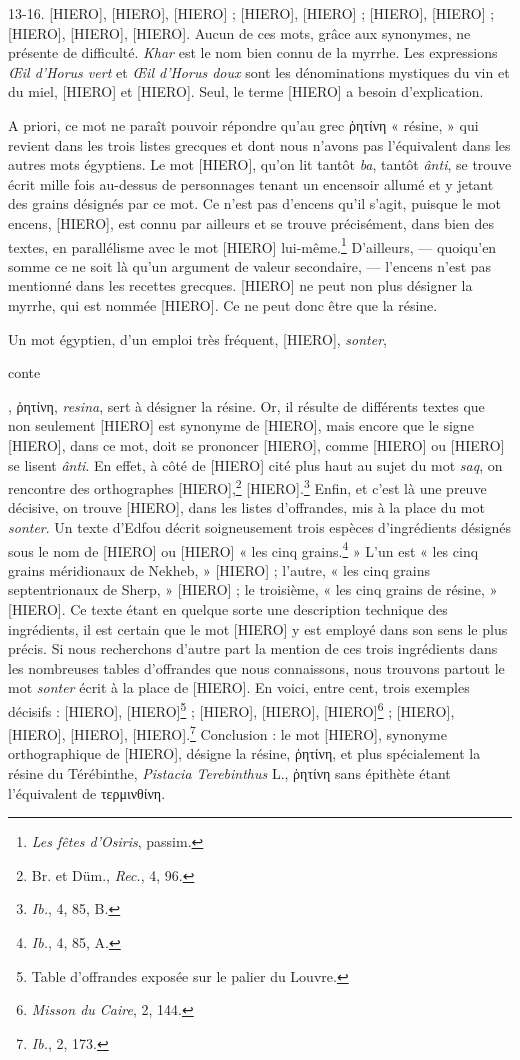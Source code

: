 \documentclass[a4paper, 11pt, oneside]{article}
\begin{document}
13-16. [HIERO], [HIERO], [HIERO] ; [HIERO], [HIERO] ; [HIERO], [HIERO] ; [HIERO], [HIERO], [HIERO]. Aucun de ces mots, grâce aux synonymes, ne présente de difficulté. \emph{Khar} est le nom bien connu de la myrrhe. Les expressions \emph{Œil d'Horus vert} et \emph{Œil d'Horus doux} sont les dénominations mystiques du vin et du miel, [HIERO] et [HIERO]. Seul, le terme [HIERO] a besoin d'explication.

A priori, ce mot ne paraît pouvoir répondre qu'au grec ῥητίνη « résine, » qui revient dans les trois listes grecques et dont nous n'avons pas l'équivalent dans les autres mots égyptiens. Le mot [HIERO], qu'on lit tantôt \emph{ba}, tantôt \emph{ânti}, se trouve écrit mille fois au-dessus de personnages tenant un encensoir allumé et y jetant des grains désignés par ce mot. Ce n'est pas d'encens qu'il s'agit, puisque le mot encens, [HIERO], est connu par ailleurs et se trouve précisément, dans bien des textes, en parallélisme avec le mot [HIERO] lui-même.\footnote{\emph{Les fêtes d'Osiris}, passim.} D'ailleurs, --- quoiqu'en somme ce ne soit là qu'un argument de valeur secondaire, --- l'encens n'est pas mentionné dans les recettes grecques. [HIERO] ne peut non plus désigner la myrrhe, qui est nommée [HIERO]. Ce ne peut donc être que la résine.

Un mot égyptien, d'un emploi très fréquent, [HIERO], \emph{sonter}, \begin{coptic}conte\end{coptic}, ῥητίνη, \emph{resina}, sert à désigner la résine. Or, il résulte de différents textes que non seulement [HIERO] est synonyme de [HIERO], mais encore que le signe [HIERO], dans ce mot, doit se prononcer [HIERO], comme [HIERO] ou [HIERO] se lisent \emph{ânti}. En effet, à côté de [HIERO] cité plus haut au sujet du mot \emph{saq}, on rencontre des orthographes [HIERO],\footnote{Br. et Düm., \emph{Rec.}, 4, 96.} [HIERO].\footnote{\emph{Ib.}, 4, 85, B.} Enfin, et c'est là une preuve décisive, on trouve [HIERO], dans les listes d'offrandes, mis à la place du mot \emph{sonter}. Un texte d'Edfou décrit soigneusement trois espèces d'ingrédients désignés sous le nom de [HIERO] ou [HIERO] « les cinq grains.\footnote{\emph{Ib.}, 4, 85, A.} » L'un est « les cinq grains méridionaux de Nekheb, » [HIERO] ; l'autre, « les cinq grains septentrionaux de Sherp, » [HIERO] ; le troisième, « les cinq grains de résine, » [HIERO]. Ce texte étant en quelque sorte une description technique des ingrédients, il est certain que le mot [HIERO] y est employé dans son sens le plus précis. Si nous recherchons d'autre part la mention de ces trois ingrédients dans les nombreuses tables d'offrandes que nous connaissons, nous trouvons partout le mot \emph{sonter} écrit à la place de [HIERO]. En voici, entre cent, trois exemples décisifs : [HIERO], [HIERO]\footnote{Table d'offrandes exposée sur le palier du Louvre.} ; [HIERO], [HIERO], [HIERO]\footnote{\emph{Misson du Caire}, 2, 144.} ; [HIERO], [HIERO], [HIERO], [HIERO].\footnote{\emph{Ib.}, 2, 173.} Conclusion : le mot [HIERO], synonyme orthographique de [HIERO], désigne la résine, ῥητίνη, et plus spécialement la résine du Térébinthe, \emph{Pistacia Terebinthus} L., ῥητίνη sans épithète étant l'équivalent de τερμινθίνη.
\clearpage
\end{document}

